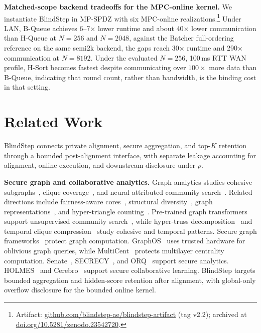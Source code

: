 \documentclass[conference,compsoc,letterpaper]{IEEEtran}
\theoremstyle{definition}
\theoremstyle{remark}
\newcommand{\BlindStep}{BlindStep\xspace}
\newcommand{\HSort}{H-Sort}
\newcommand{\HQueue}{H-Queue}
\newcommand{\BQueue}{B-Queue}
\begin{document}
\smallskip
\noindent\raisebox{0.2ex}{\scriptsize$\bullet$}\enspace
\textbf{Matched-scope backend tradeoffs for the MPC-online kernel.}
We instantiate \BlindStep{} in MP-SPDZ with six MPC-online realizations.\footnote{Artifact: \url{github.com/blindstep-ae/blindstep-artifact} (tag v2.2); archived at \url{doi.org/10.5281/zenodo.23542720}.}
Under LAN, \BQueue{} achieves 6--7$\times$ lower runtime and about
40$\times$ lower communication than \HQueue{} at $N=256$ and $N=2048$,
against the Batcher full-ordering reference on the same semi2k backend,
the gaps reach 30$\times$ runtime and 290$\times$ communication at
$N=8192$.
Under the evaluated $N{=}256$, 100\,ms RTT WAN profile, \HSort{} becomes
fastest despite communicating over $100\times$ more data than \BQueue{},
indicating that round count, rather than bandwidth, is the binding cost in
that setting.
\section{Related Work}
\label{sec:related}

\BlindStep{} connects private alignment, secure aggregation, and top-$K$ retention through a bounded post-alignment interface, with separate leakage accounting for alignment, online execution, and downstream disclosure under $\rho$.

\smallskip
\noindent\textbf{Secure graph and collaborative analytics.}
Graph analytics studies cohesive subgraphs~\cite{tan2023higher}, clique coverage~\cite{kaiyu1}, and neural attributed community search~\cite{jianwei1}.
Related directions include fairness-aware cores~\cite{tan2023maximum}, structural diversity~\cite{kaiyu2}, graph representations~\cite{zhai2025graph}, and hyper-triangle counting~\cite{yin2024hypertriangles}.
Pre-trained graph transformers support unsupervised community search~\cite{jianwei2}, while hyper-truss decomposition~\cite{yin2026hypertruss} and temporal clique compression~\cite{kaiyu3} study cohesive and temporal patterns.
Secure graph frameworks~\cite{nayak2015graphsc,araki2021secure,koti2024graphiti,yu2025graphace} protect graph computation.
GraphOS~\cite{chamani2023graphos} uses trusted hardware for oblivious graph queries, while MultiCent~\cite{bruggemann2025multicent} protects multilayer centrality computation.
Senate~\cite{poddar2021senate}, SECRECY~\cite{liagouris2023secrecy}, and ORQ~\cite{ref3} support secure analytics.
HOLMES~\cite{chang2023holmes} and Cerebro~\cite{zheng2021cerebro} support secure collaborative learning.
\BlindStep{} targets bounded aggregation and hidden-score retention after alignment, with global-only overflow disclosure for the bounded online kernel.
\end{document}
